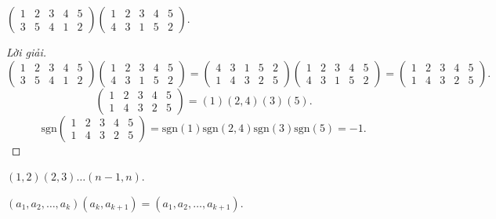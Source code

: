 \documentclass[class=nhvh-linear-algebra,crop=false]{standalone}
\newcommand{\sgn}[1]{\text{sgn}\left({#1}\right)}
\begin{document}
\begin{exercise}
	$
		\begin{pmatrix}
			1 & 2 & 3 & 4 & 5 \\
			3 & 5 & 4 & 1 & 2
		\end{pmatrix}
		\begin{pmatrix}
			1 & 2 & 3 & 4 & 5 \\
			4 & 3 & 1 & 5 & 2
		\end{pmatrix}
	$.
\end{exercise}

\begin{proof}[Lời giải]
	\[
		\begin{pmatrix}
			1 & 2 & 3 & 4 & 5 \\
			3 & 5 & 4 & 1 & 2
		\end{pmatrix}
		\begin{pmatrix}
			1 & 2 & 3 & 4 & 5 \\
			4 & 3 & 1 & 5 & 2
		\end{pmatrix}
		=
		\begin{pmatrix}
			4 & 3 & 1 & 5 & 2 \\
			1 & 4 & 3 & 2 & 5
		\end{pmatrix}
		\begin{pmatrix}
			1 & 2 & 3 & 4 & 5 \\
			4 & 3 & 1 & 5 & 2
		\end{pmatrix}
		=
		\begin{pmatrix}
			1 & 2 & 3 & 4 & 5 \\
			1 & 4 & 3 & 2 & 5
		\end{pmatrix}.
	\]
	\[
		\begin{pmatrix}
			1 & 2 & 3 & 4 & 5 \\
			1 & 4 & 3 & 2 & 5
		\end{pmatrix}
		=
		(1)(2,4)(3)(5).
	\]
	\[
		\sgn{
			\begin{matrix}
				1 & 2 & 3 & 4 & 5 \\
				1 & 4 & 3 & 2 & 5
			\end{matrix}
		}
		= \sgn{1}\sgn{2,4}\sgn{3}\sgn{5}
		= -1.
	\]
\end{proof}

\begin{exercise}
	$(1,2)(2,3)\ldots (n-1,n)$.
\end{exercise}

\begin{lemma}\label{chapter3:cycles-product}
	$(a_{1}, a_{2}, \ldots, a_{k})(a_{k},a_{k+1}) = (a_{1},a_{2},\ldots, a_{k+1})$.
\end{lemma}
\end{document}
